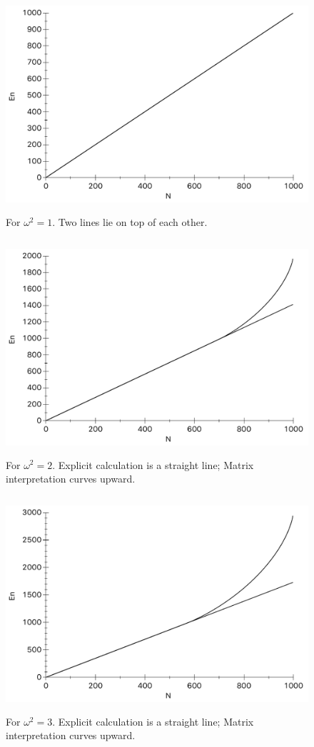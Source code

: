 \documentclass[12pt,letterpaper,notitlepage]{article}
\begin{document}
	\begin{figure}[H]
		\centering
		\includegraphics[width=13cm, height=8cm, angle=0]{w1.pdf}
			\caption{\label{Fig2} For $\omega^2 = 1$. Two lines lie on top of each other.}
	\end{figure}
	
	\begin{figure}[H]
		\centering
		\includegraphics[width=13cm, height=8cm, angle=0]{w2.pdf}
			\caption{\label{Fig3} For $\omega^2 = 2$. Explicit calculation is a straight line; Matrix interpretation curves upward.}
	\end{figure}
	
	\begin{figure}[H]
		\centering
		\includegraphics[width=13cm, height=8cm, angle=0]{w3.pdf}
			\caption{\label{Fig4} For $\omega^2 = 3$. Explicit calculation is a straight line; Matrix interpretation curves upward.}
	\end{figure}
\end{document}
